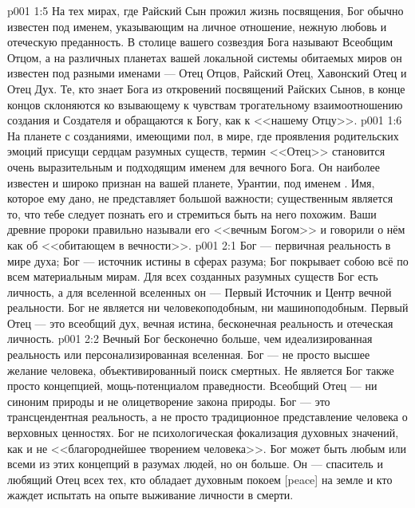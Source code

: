 \vs p001 1:5 На тех мирах, где Райский Сын прожил жизнь посвящения, Бог обычно известен под именем, указывающим на личное отношение, нежную любовь и отеческую преданность. В столице вашего созвездия Бога называют Всеобщим Отцом, а на различных планетах вашей локальной системы обитаемых миров он известен под разными именами --- Отец Отцов, Райский Отец, Хавонский Отец и Отец Дух. Те, кто знает Бога из откровений посвящений Райских Сынов, в конце концов склоняются ко взывающему к чувствам трогательному взаимоотношению создания и Создателя и обращаются к Богу, как к <<нашему Отцу>>.
\vs p001 1:6 На планете с созданиями, имеющими пол, в мире, где проявления родительских эмоций присущи сердцам разумных существ, термин <<Отец>> становится очень выразительным и подходящим именем для вечного Бога. Он наиболее известен и широко признан на вашей планете, Урантии, под именем . Имя, которое ему дано, не представляет большой важности; существенным является то, что тебе следует познать его и стремиться быть на него похожим. Ваши древние пророки правильно называли его <<вечным Богом>> и говорили о нём как об <<обитающем в вечности>>.
\vs p001 2:1 Бог --- первичная реальность в мире духа; Бог --- источник истины в сферах разума; Бог покрывает собою всё по всем материальным мирам. Для всех созданных разумных существ Бог есть личность, а для вселенной вселенных он --- Первый Источник и Центр вечной реальности. Бог не является ни человекоподобным, ни машиноподобным. Первый Отец --- это всеобщий дух, вечная истина, бесконечная реальность и отеческая личность.
\vs p001 2:2 \pc Вечный Бог бесконечно больше, чем идеализированная реальность или персонализированная вселенная. Бог --- не просто высшее желание человека, объективированный поиск смертных. Не является Бог также просто концепцией, мощь\hyp{}потенциалом праведности. Всеобщий Отец --- ни синоним природы и не олицетворение закона природы. Бог --- это трансцендентная реальность, а не просто традиционное представление человека о верховных ценностях. Бог не психологическая фокализация духовных значений, как и не <<благороднейшее творением человека>>. Бог может быть любым или всеми из этих концепций в разумах людей, но он больше. Он --- спаситель и любящий Отец всех тех, кто обладает духовным покоем [peace] на земле и кто жаждет испытать на опыте выживание личности в смерти.
